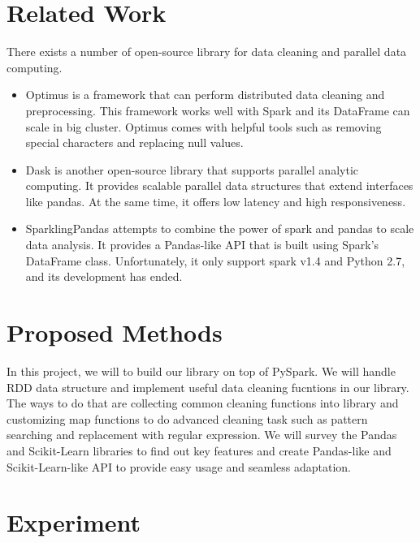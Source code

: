 \documentclass[sigconf]{acmart}
\begin{document}
\section{Related Work}
There exists a number of open-source library for data cleaning and parallel data computing. 
\begin{itemize}
	\item{Optimus}\cite{optimus} is a framework that can perform distributed data cleaning and preprocessing. This framework works well with Spark and its DataFrame can scale in big cluster. Optimus comes with helpful tools such as removing special characters and replacing null values.
	\item{Dask}\cite{dask} is another open-source library that supports parallel analytic computing. It provides scalable parallel data structures that extend interfaces like pandas. At the same time, it offers low latency and high responsiveness.
	\item{SparklingPandas}\cite{sparklingpandas} attempts to combine the power of spark and pandas to scale data analysis. It provides a Pandas-like API that is built using Spark's DataFrame class. Unfortunately, it only support spark v1.4 and Python 2.7, and its development has ended.
\end{itemize}



\section{Proposed Methods}
In this project, we will to build our library on top of PySpark\cite{pyspark, spark}. We will handle RDD data structure and implement useful data cleaning fucntions in our library. The ways to do that are collecting common cleaning functions into library and customizing map functions to do advanced cleaning task such as pattern searching and replacement with regular expression. We will survey the Pandas\cite{pandas} and Scikit-Learn\cite{scikit-learn} libraries to find out key features and create Pandas-like and Scikit-Learn-like API to provide easy usage and seamless adaptation.

\section{Experiment}
\end{document}
